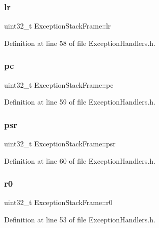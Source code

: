 \subsubsection{\texorpdfstring{lr}{lr}}
{\footnotesize\ttfamily uint32\+\_\+t Exception\+Stack\+Frame\+::lr}



Definition at line 58 of file Exception\+Handlers.\+h.

\mbox{\label{struct_exception_stack_frame_a9ca9dbdac9c690f2ec2736d59adc9325}} 
\subsubsection{\texorpdfstring{pc}{pc}}
{\footnotesize\ttfamily uint32\+\_\+t Exception\+Stack\+Frame\+::pc}



Definition at line 59 of file Exception\+Handlers.\+h.

\mbox{\label{struct_exception_stack_frame_a3b22a932476d94a66740439f456c5a0b}} 
\subsubsection{\texorpdfstring{psr}{psr}}
{\footnotesize\ttfamily uint32\+\_\+t Exception\+Stack\+Frame\+::psr}



Definition at line 60 of file Exception\+Handlers.\+h.

\mbox{\label{struct_exception_stack_frame_a438f9e853effc38bca162f3821fd176a}} 
\subsubsection{\texorpdfstring{r0}{r0}}
{\footnotesize\ttfamily uint32\+\_\+t Exception\+Stack\+Frame\+::r0}



Definition at line 53 of file Exception\+Handlers.\+h.

